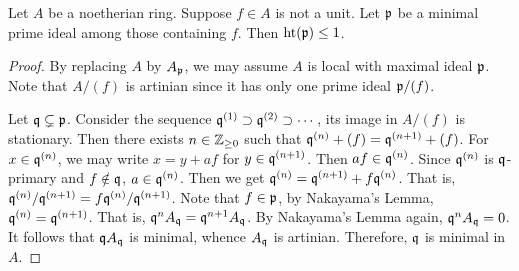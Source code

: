     \begin{theorem}\label{thm: Krull's principal ideal theorem}
        Let $A$ be a noetherian ring.
        Suppose $f \in A$ is not a unit.
        Let ${\mathfrak{p}}$ be a minimal prime ideal among those containing $f$.
        Then $\operatorname{ht}({\mathfrak{p}})\leq 1$.
    \end{theorem}
    \begin{proof}
        By replacing $A$ by $A_{\mathfrak{p}}$, we may assume $A$ is local with maximal ideal ${\mathfrak{p}}$.
        Note that $A/(f)$ is artinian since it has only one prime ideal ${\mathfrak{p}}/(f)$.

        Let ${\mathfrak{q}} \subsetneq {\mathfrak{p}}$.
        Consider the sequence ${\mathfrak{q}}^{(1)} \supset {\mathfrak{q}}^{(2)} \supset \cdots$, its image in $A/(f)$ is stationary.
        Then there exists $n \in {\mathbb{Z}}_{\geq 0}$ such that ${\mathfrak{q}}^{(n)} + (f) = {\mathfrak{q}}^{(n+1)} +(f)$.
        For $x \in {\mathfrak{q}}^{(n)}$, we may write $x = y + af$ for $y \in {\mathfrak{q}}^{(n+1)}$.
        Then $af \in {\mathfrak{q}}^{(n)}$.
        Since ${\mathfrak{q}}^{(n)}$ is ${\mathfrak{q}}$-primary and $f \notin {\mathfrak{q}}$, $a \in {\mathfrak{q}}^{(n)}$.
        Then we get ${\mathfrak{q}}^{(n)} = {\mathfrak{q}}^{(n+1)} + f {\mathfrak{q}}^{(n)}$.
        That is, ${\mathfrak{q}}^{(n)}/{\mathfrak{q}}^{(n+1)} = f {\mathfrak{q}}^{(n)}/{\mathfrak{q}}^{(n+1)}$.
        Note that $f \in {\mathfrak{p}}$, by Nakayama's Lemma, ${\mathfrak{q}}^{(n)} = {\mathfrak{q}}^{(n+1)}$.
        That is, ${\mathfrak{q}}^n A_{\mathfrak{q}} = {\mathfrak{q}}^{n+1} A_{\mathfrak{q}}$.
        By Nakayama's Lemma again, ${\mathfrak{q}}^n A_{\mathfrak{q}} = 0$.
        It follows that ${\mathfrak{q}} A_{\mathfrak{q}}$ is minimal, whence $A_{\mathfrak{q}}$ is artinian.
        Therefore, ${\mathfrak{q}}$ is minimal in $A$.
    \end{proof}

